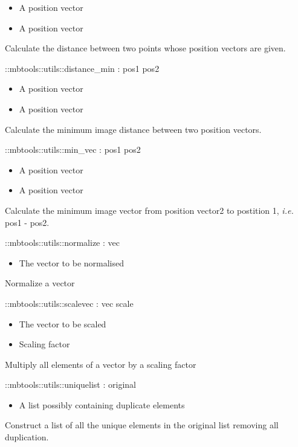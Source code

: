 \begin{itemize}
\item {} A position vector
\item {} A position vector
\end{itemize}
Calculate the distance between two points whose position vectors are given.
\begin{code}    
  ::mbtools::utils::distance_min : pos1 pos2
\end{code}
\begin{itemize}
\item {} A position vector
\item {} A position vector
\end{itemize}
Calculate the minimum image distance between two position vectors.
\begin{code}    
  ::mbtools::utils::min_vec : pos1 pos2
\end{code}
\begin{itemize}
\item {} A position vector
\item {} A position vector
\end{itemize}
Calculate the minimum image vector from position vector2 to postition 1, \emph{i.e.} pos1 - pos2.
\begin{code}    
  ::mbtools::utils::normalize : vec
\end{code}
\begin{itemize}
\item {} The vector to be normalised
\end{itemize}
Normalize a vector
\begin{code}    
  ::mbtools::utils::scalevec : vec scale
\end{code}
\begin{itemize}
\item {} The vector to be scaled
\item {} Scaling factor
\end{itemize}
Multiply all elements of a vector by a scaling factor
\begin{code}    
  ::mbtools::utils::uniquelist : original
\end{code}
\begin{itemize}
\item {} A list possibly containing duplicate elements
\end{itemize}
Construct a list of all the unique elements in the original list
removing all duplication.

